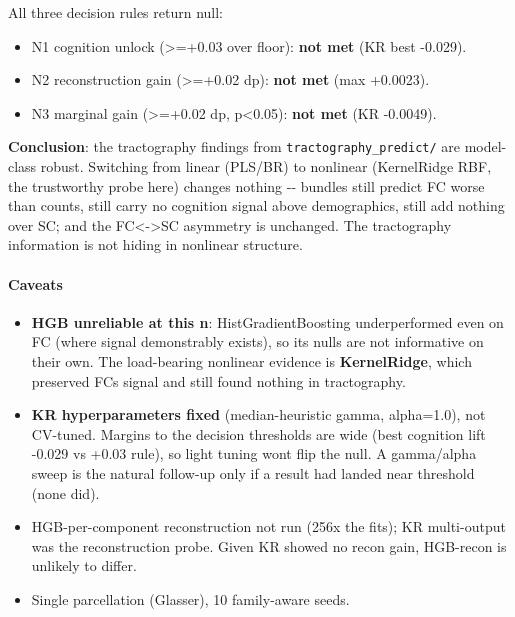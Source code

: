 All three decision rules return null:

\begin{itemize}
\tightlist
\item
  N1 cognition unlock (\textgreater=+0.03 over floor): \textbf{not met} (KR best -0.029).
\item
  N2 reconstruction gain (\textgreater=+0.02 dp): \textbf{not met} (max +0.0023).
\item
  N3 marginal gain (\textgreater=+0.02 dp, p\textless0.05): \textbf{not met} (KR -0.0049).
\end{itemize}

\textbf{Conclusion}: the tractography findings from \texttt{tractography\_predict/} are model-class robust. Switching from linear (PLS/BR) to nonlinear (KernelRidge RBF, the trustworthy probe here) changes nothing -\/- bundles still predict FC worse than counts, still carry no cognition signal above demographics, still add nothing over SC; and the FC\textless-\textgreater SC asymmetry is unchanged. The tractography information is not hiding in nonlinear structure.

\paragraph{Caveats}\label{caveats-2}

\begin{itemize}
\tightlist
\item
  \textbf{HGB unreliable at this n}: HistGradientBoosting underperformed even on FC (where signal demonstrably exists), so its nulls are not informative on their own. The load-bearing nonlinear evidence is \textbf{KernelRidge}, which preserved FC\textquotesingle s signal and still found nothing in tractography.
\item
  \textbf{KR hyperparameters fixed} (median-heuristic gamma, alpha=1.0), not CV-tuned. Margins to the decision thresholds are wide (best cognition lift -0.029 vs +0.03 rule), so light tuning won\textquotesingle t flip the null. A gamma/alpha sweep is the natural follow-up only if a result had landed near threshold (none did).
\item
  HGB-per-component reconstruction not run (256x the fits); KR multi-output was the reconstruction probe. Given KR showed no recon gain, HGB-recon is unlikely to differ.
\item
  Single parcellation (Glasser), 10 family-aware seeds.
\end{itemize}

